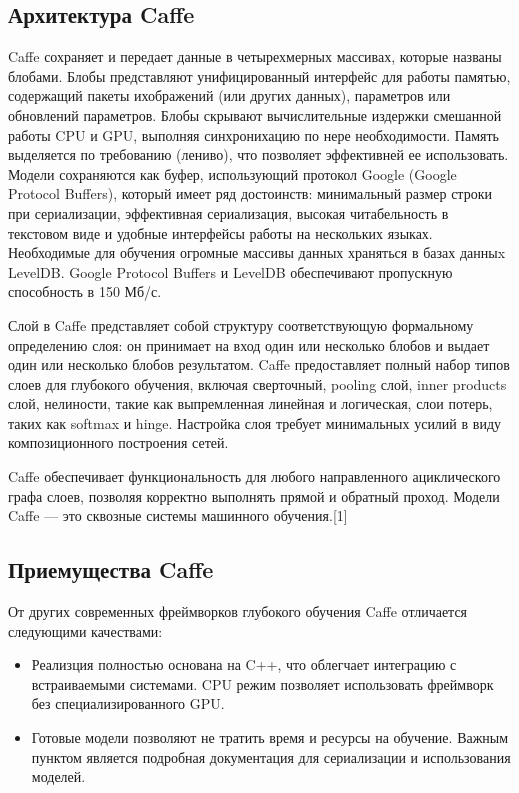 \documentclass[a4paper,english,russian]{G2-105}
\begin{document}
\subsection{Архитектура Caffe}
\par Caffe сохраняет и передает данные в четырехмерных массивах, которые названы блобами. Блобы представляют унифицированный интерфейс для работы  памятью, содержащий пакеты ихображений (или других данных), параметров или обновлений параметров. Блобы скрывают вычислительные издержки смешанной работы CPU и GPU, выполняя синхронихацию по нере необходимости. Память выделяется по требованию (лениво), что позволяет эффективней ее использовать. Модели сохраняются как буфер, использующий протокол Google (Google Protocol Buffers), который имеет ряд достоинств: минимальный размер строки при сериализации, эффективная сериализация, высокая читабельность в текстовом виде и удобные интерфейсы работы на нескольких языках. Необходимые для обучения огромные массивы данных храняться в базах данныx LevelDB. Google Protocol Buffers и LevelDB обеспечивают пропускную способность в 150 Мб/с. 
\par Слой в Caffe представляет собой структуру соответствующую формальному определению слоя: он принимает на вход один или несколько блобов и выдает один или несколько блобов результатом. Caffe предоставляет полный набор типов слоев для глубокого обучения, включая сверточный, pooling слой, inner products слой, нелиности, такие как выпремленная линейная и логическая, слои потерь, таких как softmax и hinge. Настройка слоя требует минимальных усилий в виду композиционного построения сетей.
\par Caffe обеспечивает функциональность для любого направленного ациклического графа слоев, позволяя корректно выполнять прямой и обратный проход. Модели Caffe --- это сквозные системы машинного обучения.[1]
\subsection{Приемущества Caffe}
\par От других современных фреймворков глубокого обучения Caffe отличается следующими качествами:
\begin{itemize}
	\item Реализция полностью основана на C++, что облегчает интеграцию с встраиваемыми системами. CPU режим позволяет использовать фреймворк без специализированного GPU.
	\item Готовые модели позволяют не тратить время и ресурсы на обучение. Важным пунктом является подробная документация для сериализации и использования моделей.
\end{itemize}
\end{document}

